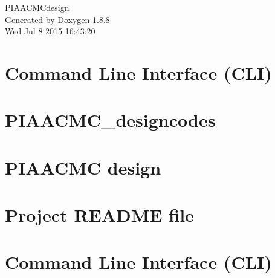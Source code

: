 \documentclass[twoside]{book}
\newcommand{\+}{\discretionary{\mbox{\scriptsize$\hookleftarrow$}}{}{}}
\newcommand{\clearemptydoublepage}{%
  \newpage{\pagestyle{empty}\cleardoublepage}%
}
\begin{document}
\hypersetup{pageanchor=false,
             bookmarks=true,
             bookmarksnumbered=true,
             pdfencoding=unicode
            }
\begin{titlepage}
\vspace*{7cm}
\begin{center}%
{\Large P\+I\+A\+A\+C\+M\+Cdesign }\\
\vspace*{1cm}
{\large Generated by Doxygen 1.8.8}\\
\vspace*{0.5cm}
{\small Wed Jul 8 2015 16:43:20}\\
\end{center}
\end{titlepage}
\clearemptydoublepage
\tableofcontents
\clearemptydoublepage
{}
\hypersetup{pageanchor=true}

\chapter{Command Line Interface (C\+L\+I)}
\label{md_PIAACMCdesign_src_CLIcore}
\hypertarget{md_PIAACMCdesign_src_CLIcore}{}

\chapter{P\+I\+A\+A\+C\+M\+C\+\_\+designcodes}
\label{md_PIAACMCdesign_src_PIAACMCsimul_PIAACMC_designcodes}
\hypertarget{md_PIAACMCdesign_src_PIAACMCsimul_PIAACMC_designcodes}{}

\chapter{P\+I\+A\+A\+C\+M\+C design}
\label{md_PIAACMCdesign_src_PIAACMCsimul_README}
\hypertarget{md_PIAACMCdesign_src_PIAACMCsimul_README}{}

\chapter{Project R\+E\+A\+D\+M\+E file}
\label{md_README}
\hypertarget{md_README}{}

\chapter{Command Line Interface (C\+L\+I)}
\label{md_src_CLIcore}
\hypertarget{md_src_CLIcore}{}

\end{document}
